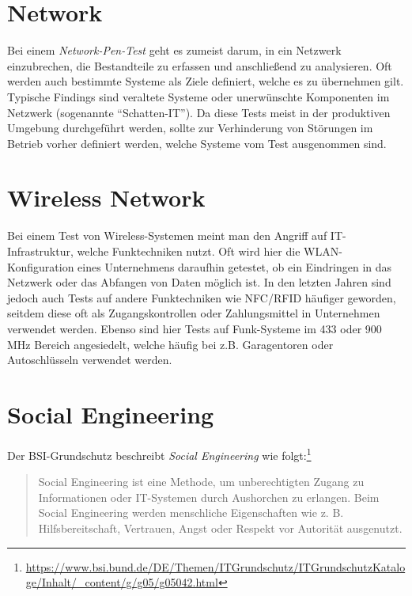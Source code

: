	\section{Network}
	Bei einem \textit{Network-Pen-Test} geht es zumeist darum, in ein Netzwerk einzubrechen, die Bestandteile zu erfassen und anschließend zu analysieren. Oft werden auch bestimmte Systeme als Ziele definiert, welche es zu übernehmen gilt. Typische Findings sind veraltete Systeme oder unerwünschte Komponenten im Netzwerk (sogenannte "`Schatten-IT"'). Da diese Tests meist in der produktiven Umgebung durchgeführt werden, sollte zur Verhinderung von Störungen im Betrieb vorher definiert werden, welche Systeme vom Test ausgenommen sind.
	
	
	\section{Wireless Network}
	Bei einem Test von Wireless-Systemen meint man den Angriff auf IT-Infrastruktur, welche Funktechniken nutzt. Oft wird hier die  WLAN-Konfiguration eines Unternehmens daraufhin getestet, ob ein Eindringen in das Netzwerk oder das Abfangen von Daten möglich ist. In den letzten Jahren sind jedoch auch Tests auf andere Funktechniken wie NFC/RFID häufiger geworden, seitdem diese oft als Zugangskontrollen oder Zahlungsmittel in Unternehmen verwendet werden. Ebenso sind hier Tests auf Funk-Systeme im 433 oder 900 MHz Bereich angesiedelt, welche häufig bei z.B. Garagentoren oder Autoschlüsseln verwendet werden.
	
	\section{Social Engineering}
	Der BSI-Grundschutz beschreibt \textit{Social Engineering} wie folgt:\footnote{\url{https://www.bsi.bund.de/DE/Themen/ITGrundschutz/ITGrundschutzKataloge/Inhalt/_content/g/g05/g05042.html}}
	\begin{quote}
Social Engineering ist eine Methode, um unberechtigten Zugang zu Informationen oder IT-Systemen durch Aushorchen zu erlangen. Beim Social Engineering werden menschliche Eigenschaften wie z. B. Hilfsbereitschaft, Vertrauen, Angst oder Respekt vor Autorität ausgenutzt. 
	\end{quote}

